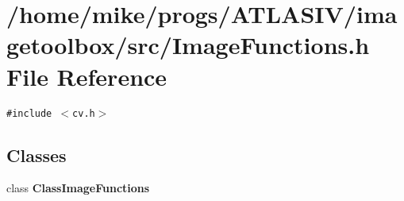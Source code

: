 \section{/home/mike/progs/ATLASIV/imagetoolbox/src/Image\-Functions.h File Reference}
\label{ImageFunctions_8h}
{\tt \#include $<$cv.h$>$}\par
\subsection*{Classes}
\begin{CompactItemize}
\item 
class {\bf Class\-Image\-Functions}
\end{CompactItemize}

